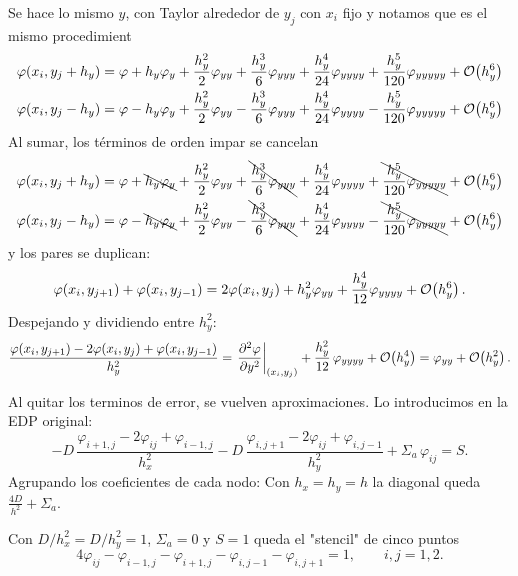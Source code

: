 Se hace lo mismo $y$, con Taylor alrededor de $y_j$ con $x_i$ fijo y notamos que es el mismo procedimient
\begin{align*}
	\varphi(x_i, y_j + h_y) &= \varphi + h_y \varphi_y + \frac{h_y^2}{2}\varphi_{yy} + \frac{h_y^3}{6}\varphi_{yyy}
	+ \frac{h_y^4}{24}\varphi_{yyyy} + \frac{h_y^5}{120}\varphi_{yyyyy} + \mathcal{O}\!\left(h_y^6\right)\\
	\varphi(x_i, y_j - h_y) &= \varphi - h_y \varphi_y + \frac{h_y^2}{2}\varphi_{yy} - \frac{h_y^3}{6}\varphi_{yyy}
	+ \frac{h_y^4}{24}\varphi_{yyyy} - \frac{h_y^5}{120}\varphi_{yyyyy} + \mathcal{O}\!\left(h_y^6\right)
\end{align*}
Al sumar, los términos de orden impar se cancelan
\begin{align*}
	\varphi(x_i, y_j + h_y) &= \varphi + \bcancel{h_y \varphi_y} + \frac{h_y^2}{2}\varphi_{yy} + \bcancel{\frac{h_y^3}{6}\varphi_{yyy}}
	+ \frac{h_y^4}{24}\varphi_{yyyy} + \bcancel{\frac{h_y^5}{120}\varphi_{yyyyy}} + \mathcal{O}\!\left(h_y^6\right)\\
	\varphi(x_i, y_j - h_y) &= \varphi - \bcancel{h_y \varphi_y} + \frac{h_y^2}{2}\varphi_{yy} - \bcancel{\frac{h_y^3}{6}\varphi_{yyy}}
	+ \frac{h_y^4}{24}\varphi_{yyyy} - \bcancel{\frac{h_y^5}{120}\varphi_{yyyyy}} + \mathcal{O}\!\left(h_y^6\right)
\end{align*}
y los pares se duplican:
\[
\varphi(x_i, y_{j+1}) + \varphi(x_i, y_{j-1}) = 2\varphi(x_i, y_j) + h_y^2 \varphi_{yy} + \frac{h_y^4}{12}\varphi_{yyyy} + \mathcal{O}\!\left(h_y^6\right).
\]
Despejando y dividiendo entre $h_y^2$:
\[
\frac{\varphi(x_i, y_{j+1}) - 2\varphi(x_i, y_j) + \varphi(x_i, y_{j-1})}{h_y^2}
= \left.\frac{\partial^2 \varphi}{\partial y^2}\right|_{(x_i,y_j)} + \frac{h_y^2}{12}\,\varphi_{yyyy} + \mathcal{O}\!\left(h_y^4\right)
= \varphi_{yy} + \mathcal{O}\!\left(h_y^2\right).
\]

Al quitar los terminos de error, se vuelven aproximaciones. Lo introducimos en la EDP original:
\[
-D\,\frac{\varphi_{i+1,j} - 2\varphi_{ij} + \varphi_{i-1,j}}{h_x^2}
- D\,\frac{\varphi_{i,j+1} - 2\varphi_{ij} + \varphi_{i,j-1}}{h_y^2} + \Sigma_a\,\varphi_{ij} = S .
\]
Agrupando los coeficientes de cada nodo:
Con $h_x = h_y = h$ la diagonal queda $\frac{4D}{h^2} + \Sigma_a$.

Con $D/h_x^2 = D/h_y^2 = 1$, $\Sigma_a = 0$ y $S = 1$ queda el "stencil" de cinco puntos
\[
4\varphi_{ij} - \varphi_{i-1,j} - \varphi_{i+1,j} - \varphi_{i,j-1} - \varphi_{i,j+1} = 1, \qquad i, j = 1, 2 .
\]

